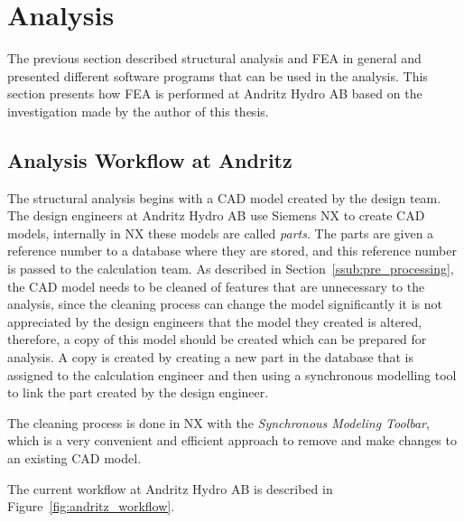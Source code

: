 
\section{Analysis} %
\label{sec:analysis}
The previous section described structural analysis and FEA in general and presented different software programs that can be used in the analysis. This section presents how FEA is performed at Andritz Hydro AB based on the investigation made by the author of this thesis.

\subsection{Analysis Workflow at Andritz} %
\label{sub:analysis_workflow_at_andritz}
The structural analysis begins with a CAD model created by the design team. The design engineers at Andritz Hydro AB use Siemens NX to create CAD models, internally in NX these models are called \textit{parts}. The parts are given a reference number to a database where they are stored, and this reference number is passed to the calculation team. As described in Section~\ref{ssub:pre_processing}, the CAD model needs to be cleaned of features that are unnecessary to the analysis, since the cleaning process can change the model significantly it is not appreciated by the design engineers that the model they created is altered, therefore, a copy of this model should be created which can be prepared for analysis. A copy is created by creating a new part in the database that is assigned to the calculation engineer and then using a synchronous modelling tool to link the part created by the design engineer.

The cleaning process is done in NX with the \textit{Synchronous Modeling Toolbar}, which is a very convenient and efficient approach to remove and make changes to an existing CAD model.~\cite{goncharov14}

The current workflow at Andritz Hydro AB is described in Figure~\ref{fig:andritz_workflow}. 

